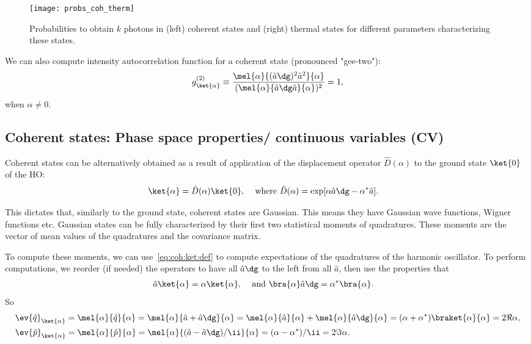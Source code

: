 \documentclass[fontsize=9pt]{scrartcl}
\begin{document}
\begin{figure}[htb]
  \centering
  \texttt{[image: probs\_coh\_therm]}
  \caption{Probabilities to obtain $k$ photons in (left) coherent states and (right) thermal states for different parameters characterizing these states.}
  \label{fig:probs_coh_therm}
\end{figure}

We can also compute intensity autocorrelation function for a coherent state (pronounced "gee-two"):
\begin{equation}
  g^{(2)}_{\ket{ \alpha }}
  \equiv
  \frac{ \mel{\alpha}{ ( \hat a\dg )^2 \hat a ^2 }{\alpha} }{
  ( \mel{\alpha}{ \hat a\dg \hat a }{\alpha})^2 }
  = 1,
\end{equation}
when $\alpha \neq 0$.

\subsection{Coherent states: Phase space properties/ continuous variables (CV)} %
\label{sec:phase_space_properties}

Coherent states can be alternatively obtained as a result of application of the displacement operator $\hat D(\alpha)$ to the ground state $\ket {0}$ of the HO:
\begin{align}
  \ket{\alpha } & = \hat D (\alpha ) \ket{ 0 },
  & \text{ where }
  \hat D (\alpha) & = \exp[ \alpha \hat a\dg - \alpha^* \hat a ].
\end{align}

This dictates that, similarly to the ground state, coherent states are Gaussian.
This means they have Gaussian wave functions, Wigner functions etc.
Gaussian states can be fully characterized by their first two statistical moments of quadratures.
These moments are the vector of mean values of the quadratures and the covariance matrix.

To compute these moments, we can use~\cref{eq:coh:ket:def} to compute expectations of the quadratures of the harmonic oscillator.
To perform computations, we reorder (if needed) the operators to have all $\hat a\dg$ to the left from all $\hat a$, then use the properties that
\begin{align}
  \hat a \ket{\alpha} & = \alpha \ket{\alpha},
  & \text{ and }
  \bra{ \alpha } \hat a\dg & = \alpha ^* \bra{ \alpha }.
\end{align}
So
\begin{align}
  & \ev{ \hat q }_{\ket{\alpha}}
  = \mel{ \alpha }{ \hat q }{ \alpha }
  = \mel{\alpha}{ \hat a + \hat a\dg }{ \alpha }
  =
  \mel{\alpha}{ \hat a }{\alpha }
  + \mel{\alpha}{ \hat a \dg }{\alpha } = ( \alpha + \alpha ^* ) \braket{ \alpha }{ \alpha }
  = 2 \Re \alpha ,
  \\
  & \ev{ \hat p }_{ \ket{\alpha}}
  = \mel{ \alpha }{ \hat p }{ \alpha }
  = \mel{\alpha}{ ( \hat a - \hat a\dg )/ \ii }{ \alpha }
  = ( \alpha - \alpha ^* ) / \ii = 2 \Im \alpha .
\end{align}
\end{document}
